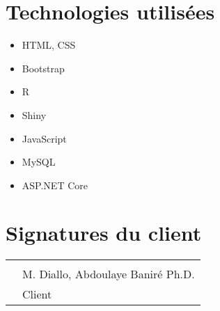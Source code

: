 \documentclass[letter,12pt]{exam}
\begin{document}
\section{Technologies utilisées}

\begin{itemize}
\tightlist
\item
  HTML, CSS
\item
  Bootstrap
\item
  R
\item
  Shiny
\item
  JavaScript
\item
  MySQL
\item
  ASP.NET Core
\end{itemize}

\section{Signatures du client}

\vspace{1cm}

\begin{tabular}{@{}p{0.2cm}p{4in}@{}}
& \hrulefill \\
& M. Diallo, Abdoulaye Baniré Ph.D. \\
& Client\\
\end{tabular}
\end{document}
